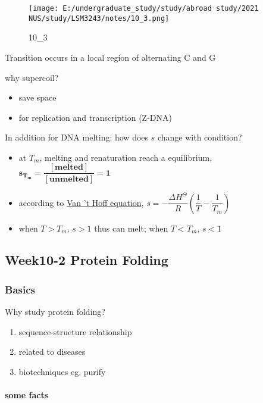\documentclass[]{article}
\let\oldparagraph\paragraph
\renewcommand{\paragraph}[1]{\oldparagraph{#1}\mbox{}}
\begin{document}
\begin{figure}
\centering
\texttt{[image: E:/undergraduate\_study/study/abroad study/2021 NUS/study/LSM3243/notes/10\_3.png]}
\caption{10\_3}
\end{figure}

Transition occurs in a local region of alternating C and G

why supercoil?

\begin{itemize}
\item
  save space
\item
  for replication and transcription (Z-DNA)
\end{itemize}

In addition for DNA melting: how does \(s\) change with condition?

\begin{itemize}
\item
  at \(T_m\), melting and renaturation reach a equilibrium,
  \(\mathbf{s_{T_m}=\dfrac{[melted]}{[unmelted]}=1}\)
\item
  according to \href{https://zh.wikipedia.org/wiki/范特霍夫方程}{Van 't
  Hoff equation},
  \(s=-\dfrac{\Delta H^\Theta}{R}(\dfrac{1}{T}-\dfrac{1}{T_m})\)
\item
  when \(T>T_m\), \(s>1\) thus can melt; when \(T<T_m\), \(s<1\)
\end{itemize}

\hypertarget{week10-2-protein-folding}{%
\subsection{Week10-2 Protein Folding}\label{week10-2-protein-folding}}

\hypertarget{basics-1}{%
\subsubsection{Basics}\label{basics-1}}

Why study protein folding?

\begin{enumerate}
\def\labelenumi{\arabic{enumi}.}
\item
  sequence-structure relationship
\item
  related to diseases
\item
  biotechniques eg. purify
\end{enumerate}

\hypertarget{some-facts}{%
\paragraph{some facts}\label{some-facts}}
\end{document}
